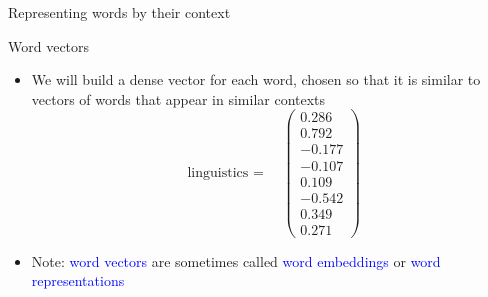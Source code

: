 \documentclass[usenames,dvipsnames,english]{beamer}
\begin{document}
\begin{frame}{Representing words by their context}
\begin{itemize}
  \begin{center}
    \end{center}
    
    \end{itemize}
\end{frame}
\begin{frame}{Word vectors}
\begin{itemize}
\setlength{\itemsep}{1.2em}

    \item We will build a dense vector for each word, chosen so that it is similar to vectors of words that appear in similar contexts
    \vspace{5pt}
    $$
        \text { linguistics = } \quad\left(\begin{array}{r}
        0.286 \\
        0.792 \\
        -0.177 \\
        -0.107 \\
        0.109 \\
        -0.542 \\
        0.349 \\
        0.271
        \end{array}\right)
    $$
    
    \item Note: \textcolor{blue}{word vectors} are sometimes called \textcolor{blue}{word embeddings} or \textcolor{blue}{word representations}
    \end{itemize}
\end{frame}
\end{document}
